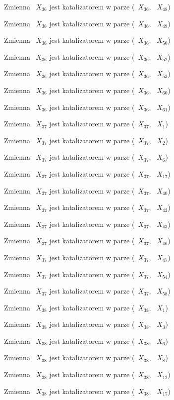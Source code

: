 \documentclass{article}
\begin{document}
Zmienna ~$X_{36}$ jest katalizatorem w parze (~$X_{36}$, ~$X_{48}$)

Zmienna ~$X_{36}$ jest katalizatorem w parze (~$X_{36}$, ~$X_{49}$)

Zmienna ~$X_{36}$ jest katalizatorem w parze (~$X_{36}$, ~$X_{50}$)

Zmienna ~$X_{36}$ jest katalizatorem w parze (~$X_{36}$, ~$X_{52}$)

Zmienna ~$X_{36}$ jest katalizatorem w parze (~$X_{36}$, ~$X_{53}$)

Zmienna ~$X_{36}$ jest katalizatorem w parze (~$X_{36}$, ~$X_{60}$)

Zmienna ~$X_{36}$ jest katalizatorem w parze (~$X_{36}$, ~$X_{61}$)

Zmienna ~$X_{37}$ jest katalizatorem w parze (~$X_{37}$, ~$X_{1}$)

Zmienna ~$X_{37}$ jest katalizatorem w parze (~$X_{37}$, ~$X_{2}$)

Zmienna ~$X_{37}$ jest katalizatorem w parze (~$X_{37}$, ~$X_{6}$)

Zmienna ~$X_{37}$ jest katalizatorem w parze (~$X_{37}$, ~$X_{17}$)

Zmienna ~$X_{37}$ jest katalizatorem w parze (~$X_{37}$, ~$X_{40}$)

Zmienna ~$X_{37}$ jest katalizatorem w parze (~$X_{37}$, ~$X_{42}$)

Zmienna ~$X_{37}$ jest katalizatorem w parze (~$X_{37}$, ~$X_{43}$)

Zmienna ~$X_{37}$ jest katalizatorem w parze (~$X_{37}$, ~$X_{46}$)

Zmienna ~$X_{37}$ jest katalizatorem w parze (~$X_{37}$, ~$X_{47}$)

Zmienna ~$X_{37}$ jest katalizatorem w parze (~$X_{37}$, ~$X_{54}$)

Zmienna ~$X_{37}$ jest katalizatorem w parze (~$X_{37}$, ~$X_{58}$)

Zmienna ~$X_{38}$ jest katalizatorem w parze (~$X_{38}$, ~$X_{1}$)

Zmienna ~$X_{38}$ jest katalizatorem w parze (~$X_{38}$, ~$X_{3}$)

Zmienna ~$X_{38}$ jest katalizatorem w parze (~$X_{38}$, ~$X_{6}$)

Zmienna ~$X_{38}$ jest katalizatorem w parze (~$X_{38}$, ~$X_{8}$)

Zmienna ~$X_{38}$ jest katalizatorem w parze (~$X_{38}$, ~$X_{12}$)

Zmienna ~$X_{38}$ jest katalizatorem w parze (~$X_{38}$, ~$X_{17}$)
\end{document}
